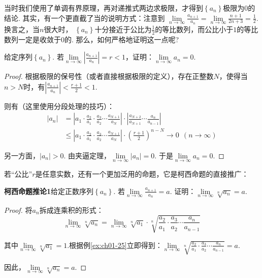 当时我们使用了单调有界原理，再对递推式两边求极限，才得到$\left\{ a_{n} \right\}$极限为$0$的结论. 其实，有一个更直截了当的说明方式：注意到
$\lim\limits_{n \to \infty}\displaystyle\frac{a_{n+1}}{a_{n}}=\lim\limits_{n \to \infty}\displaystyle\frac{n+1}{2n+3}=\displaystyle\frac{1}{2}$. 换言之，当$n$很大时， $\left\{ a_{n} \right\}$十分接近于公比为$\displaystyle\frac{1}{2}$的等比数列，而公比小于$1$的等比数列一定是收敛于$0$的.
那么，如何严格地证明这一点呢?

\begin{example}
\label{ex:ch01-26}
给定序列$\left\{ a_{n}\right\}$. 若$\lim\limits_{n \to \infty}\left| \displaystyle\frac{a_{n+1}}{a_{n}} \right|=r<1$，证明：$\lim\limits_{n \to \infty}a_{n}=0$.
\end{example}

\begin{proof}
根据极限的保号性（或者直接根据极限的定义），存在正整数$N$，使得当$n>N$时，有$\left| \displaystyle\frac{a_{n+1}}{a_{n}} \right|<\displaystyle\frac{r+1}{2}<1$.\par

则有（这里使用分段处理的技巧）：
\begin{equation}
    \begin{aligned}
        |a_{n}|
        &=  \left| a_{1}\cdot \frac{a_{2}}{a_{1}} \cdot \frac{a_{3}}{a_{2}} \cdots \frac{a_{N+1}}{a_{N}}\right| \cdot \left| \frac{a_{N+2}}{a_{N+1}} \cdots \frac{a_{n}}{a_{n-1}}  \right| \\
        &\le \left| a_{1}\cdot \frac{a_{2}}{a_{1}} \cdot \frac{a_{3}}{a_{2}} \cdots \frac{a_{N+1}}{a_{N}}\right| \cdot \left( \frac{r+1}{2} \right)^{n-N} \to 0~~(n \to \infty)
        \nonumber
    \end{aligned}
\end{equation}

另一方面，$|a_{n}|>0$. 由夹逼定理，$\lim\limits_{n \to \infty}|a_{n}|=0$. 于是$\lim\limits_{n \to \infty}a_{n}=0$.
\end{proof}

若“公比”$r$是任意实数，还有一个更加泛用的命题，它是柯西命题的直接推广：

\begin{example}
\label{ex:ch01-27}
\textbf{柯西命题推论1}\quad 给定正数序列$\left\{ a_{n}\right\}$. 若$\lim\limits_{n \to \infty}  \displaystyle\frac{a_{n+1}}{a_{n}} =a$.
证明：$\lim\limits_{n \to \infty} \sqrt[n]{a_{n}}=a$.
\end{example}

\begin{proof}
将$a_{n}$拆成连乘积的形式：
$$
\lim\limits_{n \to \infty} \sqrt[n]{a_{n}} = \lim\limits_{n \to \infty} \sqrt[n]{a_{1}} \cdot \sqrt[n]{\frac{a_{2}}{a_{1}} \cdot \frac{a_{3}}{a_{2}} \cdots \frac{a_{n}}{a_{n-1}}  }
$$

其中$\lim\limits_{n \to \infty} \sqrt[n]{a_{1}}=1$.根据例\ref{ex:ch01-25}立即得到：$\lim\limits_{n \to \infty} \sqrt[n]{ \displaystyle\frac{a_{2}}{a_{1}} \cdot \displaystyle\frac{a_{3}}{a_{2}} \cdots \frac{a_{n}}{a_{n-1}}}=a$.

因此，$\lim\limits_{n \to \infty} \sqrt[n]{a_{n}}=a$.
\end{proof}

